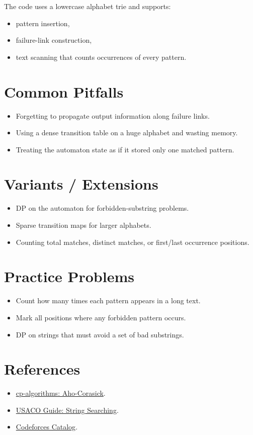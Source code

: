The code uses a lowercase alphabet trie and supports:

\begin{itemize}
  \item pattern insertion,
  \item failure-link construction,
  \item text scanning that counts occurrences of every pattern.
\end{itemize}

\section*{Common Pitfalls}

\begin{itemize}
  \item Forgetting to propagate output information along failure links.
  \item Using a dense transition table on a huge alphabet and wasting memory.
  \item Treating the automaton state as if it stored only one matched pattern.
\end{itemize}

\section*{Variants / Extensions}

\begin{itemize}
  \item DP on the automaton for forbidden-substring problems.
  \item Sparse transition maps for larger alphabets.
  \item Counting total matches, distinct matches, or first/last occurrence positions.
\end{itemize}

\section*{Practice Problems}

\begin{itemize}
  \item Count how many times each pattern appears in a long text.
  \item Mark all positions where any forbidden pattern occurs.
  \item DP on strings that must avoid a set of bad substrings.
\end{itemize}

\section*{References}

\begin{itemize}
  \item \href{https://cp-algorithms.com/string/aho_corasick.html}{cp-algorithms: Aho-Corasick}.
  \item \href{https://usaco.guide/adv/string-search}{USACO Guide: String Searching}.
  \item \href{https://codeforces.com/catalog}{Codeforces Catalog}.
\end{itemize}
